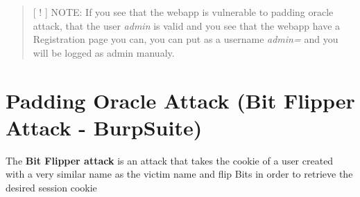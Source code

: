 \documentclass{assets/ipesethesis}
\begin{document}
\begin{quote}
{[} ! {]} NOTE: If you see that the webapp is vulnerable to padding oracle attack, that the user \emph{admin} is valid and you see that the webapp have
a Registration page you can, you can put as a username \emph{admin=} and you will be logged as admin manualy.
\end{quote}

\hypertarget{padding-oracle-attack-bit-flipper-attack---burpsuite}{%
\section*{Padding Oracle Attack (Bit Flipper Attack - BurpSuite)}\label{padding-oracle-attack-bit-flipper-attack---burpsuite}}

The \textbf{Bit Flipper attack} is an attack that takes the cookie of a user created with a very similar name as the victim name and flip Bits in order to retrieve the
desired session cookie
\end{document}
